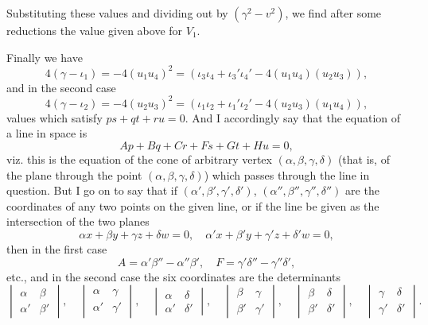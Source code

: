 \documentclass[12pt,a4paper]{article}
\theoremstyle{definition}
\begin{document}
Substituting these values and dividing out by $(\gamma^2 - v^2)$, we find after some reductions the value given above for $V_1$.

Finally we have
\[
4(\gamma - \iota_1) = -4(u_1u_4)^2 = (\iota_3\iota_4 + \iota_3'\iota_4' - 4(u_1u_4)(u_2u_3)),\]
and in the second case
\[
4(\gamma - \iota_2) = -4(u_2u_3)^2 = (\iota_1\iota_2 + \iota_1'\iota_2' - 4(u_2u_3)(u_1u_4)),\]
values which satisfy $ps + qt + ru = 0$. And I accordingly say that the equation of a line in space is
\[
Ap + Bq + Cr + Fs + Gt + Hu = 0,
\]
viz. this is the equation of the cone of arbitrary vertex $(\alpha, \beta, \gamma, \delta)$ (that is, of the plane through the point $(\alpha, \beta, \gamma, \delta)$) which passes through the line in question. But I go on to say that if $(\alpha', \beta', \gamma', \delta')$, $(\alpha'', \beta'', \gamma'', \delta'')$ are the coordinates of any two points on the given line, or if the line be given as the intersection of the two planes
\[
\alpha x + \beta y + \gamma z + \delta w = 0,\quad \alpha' x + \beta' y + \gamma' z + \delta' w = 0,
\]
then in the first case
\[
A = \alpha'\beta'' - \alpha''\beta',\quad F = \gamma'\delta'' - \gamma''\delta',
\]
etc., and in the second case the six coordinates are the determinants
\[
\begin{vmatrix}
\alpha & \beta \\
\alpha' & \beta'
\end{vmatrix},\quad
\begin{vmatrix}
\alpha & \gamma \\
\alpha' & \gamma'
\end{vmatrix},\quad
\begin{vmatrix}
\alpha & \delta \\
\alpha' & \delta'
\end{vmatrix},\quad
\begin{vmatrix}
\beta & \gamma \\
\beta' & \gamma'
\end{vmatrix},\quad
\begin{vmatrix}
\beta & \delta \\
\beta' & \delta'
\end{vmatrix},\quad
\begin{vmatrix}
\gamma & \delta \\
\gamma' & \delta'
\end{vmatrix}.
\]

\vspace{0.5em}
\end{document}
